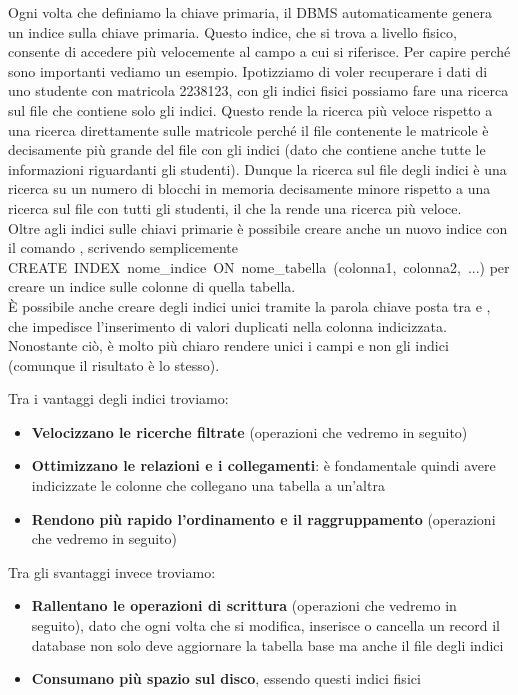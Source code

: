 \documentclass[11pt, a4paper, titlepage, oneside]{scrbook}
\begin{document}
Ogni volta che definiamo la chiave primaria, il DBMS automaticamente genera un indice sulla chiave primaria. Questo indice, che si trova a livello fisico, consente di accedere più velocemente al campo a cui si riferisce. Per capire perché sono importanti vediamo un esempio. Ipotizziamo di voler recuperare i dati di uno studente con matricola 2238123, con gli indici fisici possiamo fare una ricerca sul file che contiene solo gli indici. Questo rende la ricerca più veloce rispetto a una ricerca direttamente sulle matricole perché il file contenente le matricole è decisamente più grande del file con gli indici (dato che contiene anche tutte le informazioni riguardanti gli studenti). Dunque la ricerca sul file degli indici è una ricerca su un numero di blocchi in memoria decisamente minore rispetto a una ricerca sul file con tutti gli studenti, il che la rende una ricerca più veloce. \\
Oltre agli indici sulle chiavi primarie è possibile creare anche un nuovo indice con il comando , scrivendo semplicemente \mbox{CREATE INDEX nome\_indice ON nome\_tabella (colonna1, colonna2, ...)} per creare un indice sulle colonne di quella tabella. \\ 
\NB È possibile anche creare degli indici unici tramite la parola chiave  posta tra  e , che impedisce l'inserimento di valori duplicati nella colonna indicizzata. Nonostante ciò, è molto più chiaro rendere unici i campi e non gli indici (comunque il risultato è lo stesso).

Tra i vantaggi degli indici troviamo:
\begin{itemize}
    \item \textbf{Velocizzano le ricerche filtrate} (operazioni che vedremo in seguito)
    \item \textbf{Ottimizzano le relazioni e i collegamenti}: è fondamentale quindi avere indicizzate le colonne che collegano una tabella a un'altra
    \item \textbf{Rendono più rapido l'ordinamento e il raggruppamento} (operazioni che vedremo in seguito)
\end{itemize}

Tra gli svantaggi invece troviamo:
\begin{itemize}
    \item \textbf{Rallentano le operazioni di scrittura} (operazioni che vedremo in seguito), dato che ogni volta che si modifica, inserisce o cancella un record il database non solo deve aggiornare la tabella base ma anche il file degli indici
    \item \textbf{Consumano più spazio sul disco}, essendo questi indici fisici
\end{itemize}
\end{document}
